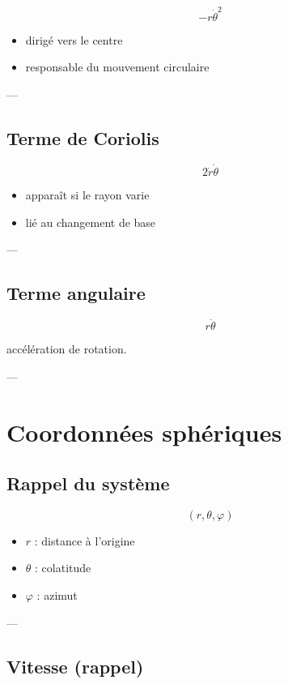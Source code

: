 \documentclass[11pt,a4paper]{article}
\begin{document}
\[
-r\dot{\theta}^2
\]

\begin{itemize}
\item dirigé vers le centre
\item responsable du mouvement circulaire
\end{itemize}

---

\subsection{Terme de Coriolis}

\[
2\dot{r}\dot{\theta}
\]

\begin{itemize}
\item apparaît si le rayon varie
\item lié au changement de base
\end{itemize}

---

\subsection{Terme angulaire}

\[
r\ddot{\theta}
\]

accélération de rotation.

---

\section{Coordonnées sphériques}

\subsection{Rappel du système}

\[
(r,\theta,\varphi)
\]

\begin{itemize}
\item $r$ : distance à l’origine
\item $\theta$ : colatitude
\item $\varphi$ : azimut
\end{itemize}

---

\subsection{Vitesse (rappel)}
\end{document}
